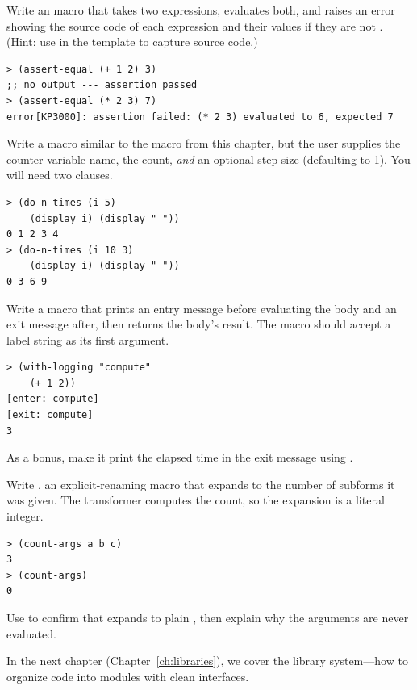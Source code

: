 \begin{exercise}
Write an  macro that takes two expressions, evaluates both, and raises an error showing the source code of each expression and their values if they are not . (Hint: use  in the template to capture source code.)

\begin{lstlisting}[style=repl]
> (assert-equal (+ 1 2) 3)
;; no output --- assertion passed
> (assert-equal (* 2 3) 7)
error[KP3000]: assertion failed: (* 2 3) evaluated to 6, expected 7
\end{lstlisting}
\end{exercise}

\begin{exercise}
Write a  macro similar to the  macro from this chapter, but the user supplies the counter variable name, the count, \emph{and} an optional step size (defaulting to 1). You will need two  clauses.

\begin{lstlisting}[style=repl]
> (do-n-times (i 5)
    (display i) (display " "))
0 1 2 3 4
> (do-n-times (i 10 3)
    (display i) (display " "))
0 3 6 9
\end{lstlisting}
\end{exercise}

\begin{exercise}
Write a  macro that prints an entry message before evaluating the body and an exit message after, then returns the body's result. The macro should accept a label string as its first argument.

\begin{lstlisting}[style=repl]
> (with-logging "compute"
    (+ 1 2))
[enter: compute]
[exit: compute]
3
\end{lstlisting}

As a bonus, make it print the elapsed time in the exit message using .
\end{exercise}

\begin{exercise}
Write , an explicit-renaming macro that expands to the number of subforms it was given. The transformer computes the count, so the expansion is a literal integer.

\begin{lstlisting}[style=repl]
> (count-args a b c)
3
> (count-args)
0
\end{lstlisting}

Use  to confirm that  expands to plain , then explain why the arguments are never evaluated.
\end{exercise}

In the next chapter (Chapter~\ref{ch:libraries}), we cover the library system---how to organize code into modules with clean interfaces.

\chapterend
